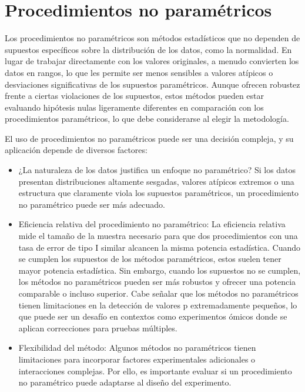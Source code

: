 \documentclass{config/apuntes}\usepackage[]{graphicx}\usepackage[]{xcolor}
\begin{document}
\section{Procedimientos no paramétricos}
Los procedimientos no paramétricos son métodos estadísticos que no dependen de supuestos específicos sobre la distribución de los datos, como la normalidad. En lugar de trabajar directamente con los valores originales, a menudo convierten los datos en rangos, lo que les permite ser menos sensibles a valores atípicos o desviaciones significativas de los supuestos paramétricos. Aunque ofrecen robustez frente a ciertas violaciones de los supuestos, estos métodos pueden estar evaluando hipótesis nulas ligeramente diferentes en comparación con los procedimientos paramétricos, lo que debe considerarse al elegir la metodología.

El uso de procedimientos no paramétricos puede ser una decisión compleja, y su aplicación depende de diversos factores:
\begin{itemize} 
\item ¿La naturaleza de los datos justifica un enfoque no paramétrico?
Si los datos presentan distribuciones altamente sesgadas, valores atípicos extremos o una estructura que claramente viola los supuestos paramétricos, un procedimiento no paramétrico puede ser más adecuado.
\item Eficiencia relativa del procedimiento no paramétrico:
La eficiencia relativa mide el tamaño de la muestra necesario para que dos procedimientos con una tasa de error de tipo I similar alcancen la misma potencia estadística. Cuando se cumplen los supuestos de los métodos paramétricos, estos suelen tener mayor potencia estadística. Sin embargo, cuando los supuestos no se cumplen, los métodos no paramétricos pueden ser más robustos y ofrecer una potencia comparable o incluso superior.
Cabe señalar que los métodos no paramétricos tienen limitaciones en la detección de valores p extremadamente pequeños, lo que puede ser un desafío en contextos como experimentos ómicos donde se aplican correcciones para pruebas múltiples.
\item Flexibilidad del método:
Algunos métodos no paramétricos tienen limitaciones para incorporar factores experimentales adicionales o interacciones complejas. Por ello, es importante evaluar si un procedimiento no paramétrico puede adaptarse al diseño del experimento.
\end{itemize}
\end{document}
